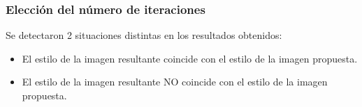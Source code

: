 \documentclass[10pt,center]{beamer}
\begin{document}
\begin{frame}
\begin{figure}
\begin{center}
\begin{tabularx}{\textwidth}{@{}cXX@{}}
      \end{tabularx}
      \end{center}

    \end{figure}
\end{frame}

\begin{frame}
  \frametitle{Elección del número de iteraciones}
  Se detectaron 2 situaciones distintas en los resultados obtenidos:
  \begin{itemize}
    \item El estilo de la imagen resultante coincide con el estilo de la imagen propuesta.
    \item El estilo de la imagen resultante NO coincide con el estilo de la imagen propuesta.
  \end{itemize}

\end{frame}
\end{document}
